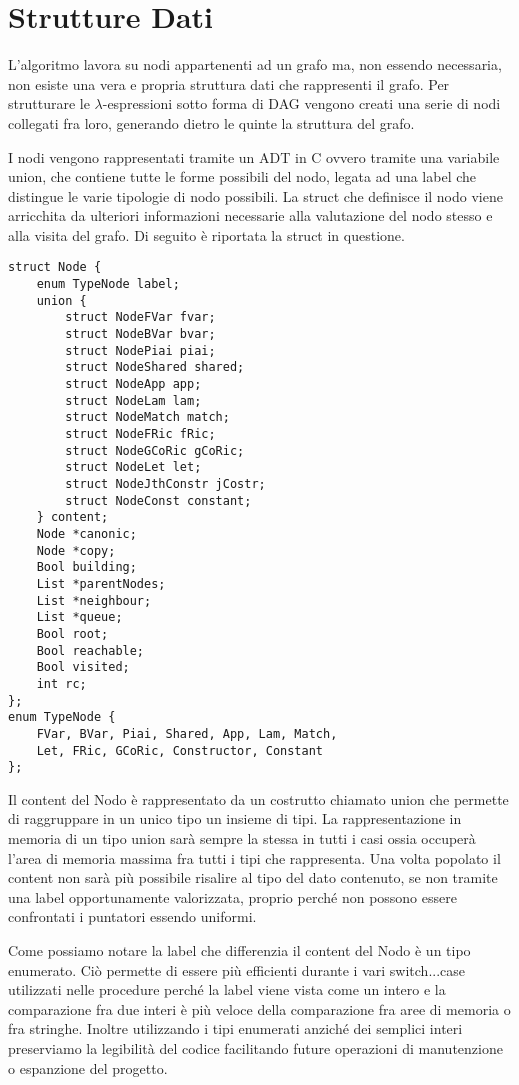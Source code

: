 \documentclass[12pt,a4paper,openright,twoside]{report}
\begin{document}
\section{Strutture Dati}
L'algoritmo lavora su nodi appartenenti ad un grafo ma, non essendo necessaria, non esiste una vera e propria struttura dati che rappresenti il grafo. Per strutturare le $\lambda$-espressioni sotto forma di DAG vengono creati una serie di nodi collegati fra loro, generando dietro le quinte la struttura del grafo.

I nodi vengono rappresentati tramite un ADT in C ovvero tramite una variabile union, che contiene tutte le forme possibili del nodo, legata ad una label che distingue le varie tipologie di nodo possibili. La struct che definisce il nodo viene arricchita da ulteriori informazioni necessarie alla valutazione del nodo stesso e alla visita del grafo. Di seguito \`e riportata la struct in questione.

\begin{verbatim}
struct Node {
    enum TypeNode label;
    union {
        struct NodeFVar fvar;
        struct NodeBVar bvar;
        struct NodePiai piai;
        struct NodeShared shared;
        struct NodeApp app;
        struct NodeLam lam;
        struct NodeMatch match;
        struct NodeFRic fRic;
        struct NodeGCoRic gCoRic;
        struct NodeLet let;
        struct NodeJthConstr jCostr;
        struct NodeConst constant;
    } content;
    Node *canonic;
    Node *copy;
    Bool building;
    List *parentNodes;
    List *neighbour;
    List *queue;
    Bool root;
    Bool reachable;
    Bool visited;
    int rc;
};
enum TypeNode {
    FVar, BVar, Piai, Shared, App, Lam, Match, 
    Let, FRic, GCoRic, Constructor, Constant
};
\end{verbatim}


Il content del Nodo \`e rappresentato da un costrutto chiamato union che permette di raggruppare in un unico tipo un insieme di tipi. La rappresentazione in memoria di un tipo union sar\`a sempre la stessa in tutti i casi ossia occuper\`a l'area di memoria massima fra tutti i tipi che rappresenta. Una volta popolato il content non sar\`a pi\`u possibile risalire al tipo del dato contenuto, se non tramite una label opportunamente valorizzata, proprio perch\'e non possono essere confrontati i puntatori essendo uniformi.

Come possiamo notare la label che differenzia il content del Nodo \`e un tipo enumerato. Ci\`o permette di essere pi\`u efficienti durante i vari switch...case utilizzati nelle procedure perch\'e la label viene vista come un intero e la comparazione fra due interi \`e pi\`u veloce della comparazione fra aree di memoria o fra stringhe. Inoltre utilizzando i tipi enumerati anzich\'e dei semplici interi preserviamo la legibilit\`a del codice facilitando future operazioni di manutenzione o espanzione del progetto.
\end{document}
